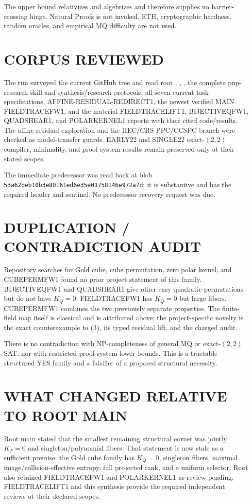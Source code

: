 \documentclass[11pt]{article}
\begin{document}
The upper bound relativizes and algebrizes and therefore supplies no
barrier-crossing hinge.  Natural Proofs is not invoked.  ETH, cryptographic
hardness, random oracles, and empirical MQ difficulty are not used.

\section{CORPUS REVIEWED}
The run surveyed the current GitHub tree and read root ,
, , the complete pnp-research skill and
synthesis/research protocols, all seven current task specifications,
AFFINE-RESIDUAL-REDIRECT1, the newest verified MAIN FIELDTRACEFW1, and the
material FIELDTRACELIFT1, BIJECTIVEQFW1, QUADSHEAR1, and POLARKERNEL1 reports
with their cited code/results.  The affine-residual exploration and the
HEC/CRS-PPC/CCSPC branch were checked as model-transfer guards.  EARLY22 and
SINGLE22 exact-$(2,2)$ compiler, minimality, and proof-system results remain
preserved only at their stated scopes.

The immediate predecessor
was read back at blob
\texttt{53a62beb10b3e80161ed6e35e01758146e972a7d}; it is substantive and has
the required header and sentinel.  No predecessor recovery request was due.

\section{DUPLICATION / CONTRADICTION AUDIT}
Repository searches for Gold cube, cube permutation, zero polar kernel, and
CUBEPERMFW1 found no prior project statement of this family.  BIJECTIVEQFW1
and QUADSHEAR1 give other easy quadratic permutations but do not have
$K_Q=0$.  FIELDTRACEFW1 has $K_Q=0$ but large fibers.  CUBEPERMFW1 combines
the two previously separate properties.  The finite-field map itself is
classical and is attributed above; the project-specific novelty is the exact
counterexample to (3), its typed residual lift, and the charged audit.

There is no contradiction with NP-completeness of general MQ or exact-$(2,2)$
SAT, nor with restricted proof-system lower bounds.  This is a tractable
structured YES family and a falsifier of a proposed structural necessity.

\section{WHAT CHANGED RELATIVE TO ROOT MAIN}
Root main stated that the smallest remaining structural corner was jointly
$K_F=0$ and singleton/polynomial fibers.  That statement is now stale as a
sufficient premise: the Gold cube family has $K_Q=0$, singleton fibers,
maximal image/collision-effective entropy, full projected rank, and a
uniform selector.  Root also retained FIELDTRACEFW1 and POLARKERNEL1 as
review-pending; FIELDTRACELIFT1 and this synthesis provide the required
independent reviews at their declared scopes.
\end{document}

